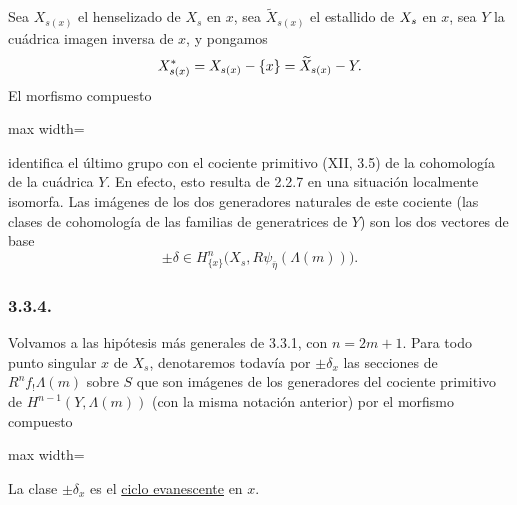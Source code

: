 Sea $X_{s(x)}$ el henselizado de $X_s$ en $x$, sea
$\widetilde X_{s(x)}$ el estallido de $\sisi{\widetilde X_s}{X_s}$ en $x$, sea $Y$ la
cuádrica imagen inversa de $x$, y pongamos
\[
\sisi{\widetilde X^*_{s(x)}}{X^*_{s(x)}}
=X_{s(x)}-\{x\}=\widetilde X_{s(x)}-Y.
\]
El morfismo compuesto
\begin{center}
\begin{adjustbox}{max width=\linewidth}\end{adjustbox}
\end{center}
identifica el último grupo con el cociente primitivo (XII, 3.5) de la
cohomología de la cuádrica $Y$. En efecto, esto resulta de 2.2.7 en
una situación localmente isomorfa. Las imágenes de los dos generadores
naturales de este cociente (las clases de cohomología de las familias de
generatrices de $Y$) son los dos vectores de base
\[
\pm\delta\in
H^n_{\{x\}}\bigl(X_s,R\psi_{\bar\eta}(\Lambda(m))\bigr).
\]

\pageoriginale

\subsubsection*{3.3.4.}
Volvamos a las hipótesis más generales de 3.3.1, con $n=2m+1$. Para
todo punto singular $x$ de $X_s$, denotaremos todavía por
$\pm\delta_x$ las secciones de $R^nf_!\Lambda(m)$ sobre $S$ que son
imágenes de los generadores del cociente primitivo de
$H^{n-1}(Y,\Lambda(m))$ (con la misma notación anterior) por el
morfismo compuesto
\begin{center}
\begin{adjustbox}{max width=\linewidth}\end{adjustbox}
\end{center}
La clase $\pm\delta_x$ es el \underline{ciclo evanescente} en $x$.

